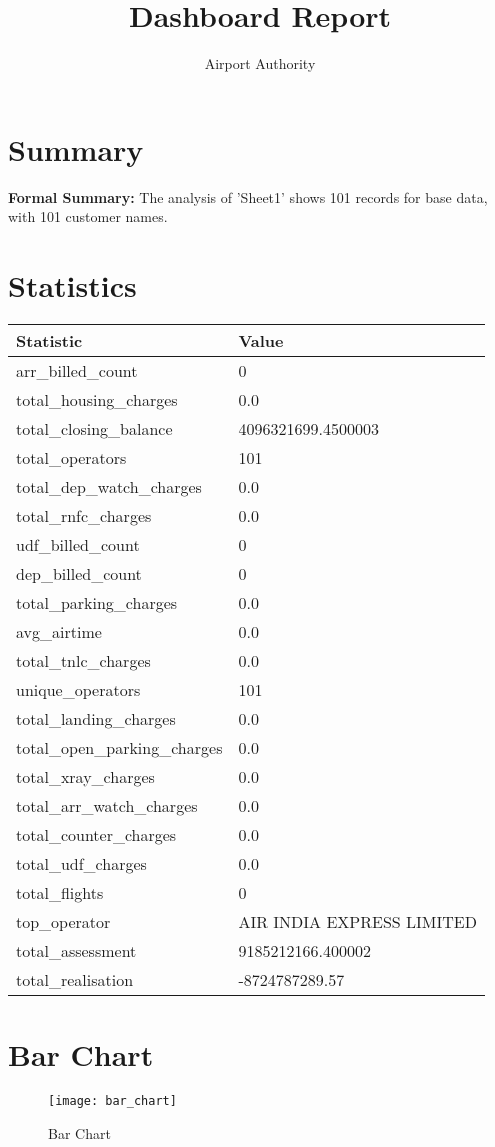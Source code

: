 \documentclass[a4paper,12pt]{article}
\title{Dashboard Report}
\author{Airport Authority}
\date{}
\begin{document}
\maketitle
\section*{Summary}
\textbf{Formal Summary:} The analysis of 'Sheet1' shows 101 records for base data, with 101 customer names.

\section*{Statistics}
\begin{tabular}{ll}
\toprule
Statistic & Value \\
\midrule
arr_billed_count & 0 \\
total_housing_charges & 0.0 \\
total_closing_balance & 4096321699.4500003 \\
total_operators & 101 \\
total_dep_watch_charges & 0.0 \\
total_rnfc_charges & 0.0 \\
udf_billed_count & 0 \\
dep_billed_count & 0 \\
total_parking_charges & 0.0 \\
avg_airtime & 0.0 \\
total_tnlc_charges & 0.0 \\
unique_operators & 101 \\
total_landing_charges & 0.0 \\
total_open_parking_charges & 0.0 \\
total_xray_charges & 0.0 \\
total_arr_watch_charges & 0.0 \\
total_counter_charges & 0.0 \\
total_udf_charges & 0.0 \\
total_flights & 0 \\
top_operator & AIR INDIA EXPRESS LIMITED \\
total_assessment & 9185212166.400002 \\
total_realisation & -8724787289.57 \\
\bottomrule
\end{tabular}

\section*{Bar Chart}
\begin{figure}[h]
\centering
\texttt{[image: bar\_chart]}
\caption{Bar Chart}
\end{figure}
\end{document}
